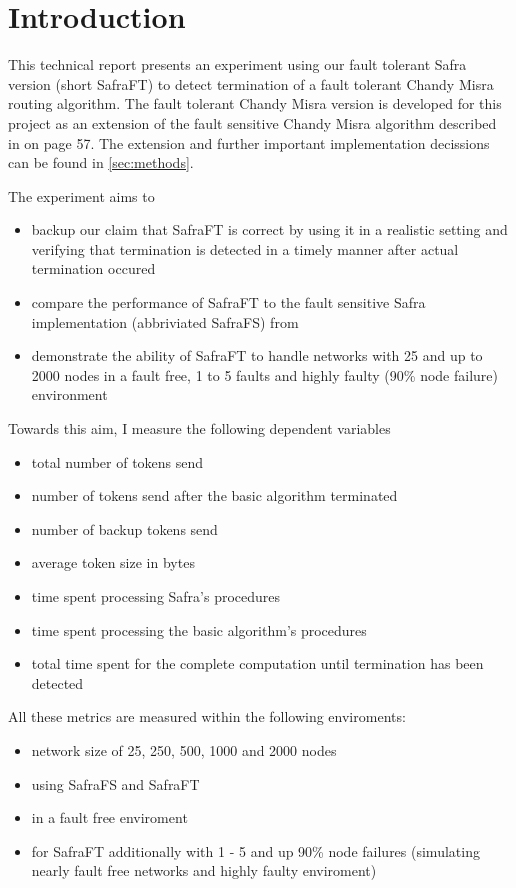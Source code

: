 \section{Introduction} 
This technical report presents an experiment using our fault tolerant Safra version (short SafraFT) \cite{ourpaper}
  to detect termination of a fault tolerant Chandy Misra routing algorithm.
 The fault tolerant Chandy Misra version is developed for this project as an extension of the fault sensitive Chandy Misra algorithm described in \cite{fokkink,2018} on page 57.
 The extension and further important implementation decissions can be found in \cref{sec:methods}.
 
The experiment aims to
\begin{itemize}
	\item backup our claim that SafraFT is correct by using it in a realistic setting and verifying that termination is detected in a timely manner after actual termination occured
	\item compare the performance of SafraFT to the fault sensitive Safra implementation (abbriviated SafraFS) from \cite{safraPaper}
	\item demonstrate the ability of SafraFT to handle networks with 25 and up to 2000 nodes in a fault free, 1 to 5 faults and highly faulty (90\% node failure) environment
\end{itemize}

Towards this aim, I measure the following dependent variables
\begin{itemize}
	\item total number of tokens send
	\item number of tokens send after the basic algorithm terminated
	\item number of backup tokens send
	\item average token size in bytes
	\item time spent processing Safra's procedures
	\item time spent processing the basic algorithm's procedures
	\item total time spent for the complete computation until termination has been detected
\end{itemize} 

All these metrics are measured within the following enviroments:
\begin{itemize}
	\item network size of 25, 250, 500, 1000 and 2000 nodes
	\item using SafraFS and SafraFT
	\item in a fault free enviroment
	\item for SafraFT additionally with 1 - 5 and up 90\% node failures (simulating nearly fault free networks and highly faulty enviroment)
\end{itemize}

